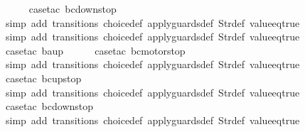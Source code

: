 \begin{isabellebody}
\ \ \ \ \isamarkupfalse%
\ {\isacharparenleft}case{\isacharunderscore}tac\ {\isachardoublequoteopen}bc{\isacharequal}down{}{}stop{\isachardoublequoteclose}{\isacharparenright}\isanewline
\ \ \ \ \ \isamarkupfalse%
\ {\isacharparenleft}simp\ add{\isacharcolon}\ transitions\ choice{\isacharunderscore}def\ apply{\isacharunderscore}guards{\isacharunderscore}def\ Str{\isacharunderscore}def\ value{\isacharunderscore}eq{\isacharunderscore}true{\isacharparenright}\isanewline
\ \ \ \ \isamarkupfalse%
\ {\isacharparenleft}simp\ add{\isacharcolon}\ transitions\ choice{\isacharunderscore}def\ apply{\isacharunderscore}guards{\isacharunderscore}def\ Str{\isacharunderscore}def\ value{\isacharunderscore}eq{\isacharunderscore}true{\isacharparenright}\isanewline
\ \ \ \isamarkupfalse%
\ {\isacharparenleft}case{\isacharunderscore}tac\ {\isachardoublequoteopen}ba{\isacharequal}up{}{}{\isachardoublequoteclose}{\isacharparenright}\isanewline
\ \ \ \ \isamarkupfalse%
\ {\isacharparenleft}case{\isacharunderscore}tac\ {\isachardoublequoteopen}bc{\isacharequal}motorstop{}{\isachardoublequoteclose}{\isacharparenright}\isanewline
\ \ \ \ \ \isamarkupfalse%
\ {\isacharparenleft}simp\ add{\isacharcolon}\ transitions\ choice{\isacharunderscore}def\ apply{\isacharunderscore}guards{\isacharunderscore}def\ Str{\isacharunderscore}def\ value{\isacharunderscore}eq{\isacharunderscore}true{\isacharparenright}\isanewline
\ \ \ \ \isamarkupfalse%
\ {\isacharparenleft}case{\isacharunderscore}tac\ {\isachardoublequoteopen}bc{\isacharequal}up{}{}stop{\isachardoublequoteclose}{\isacharparenright}\isanewline
\ \ \ \ \ \isamarkupfalse%
\ {\isacharparenleft}simp\ add{\isacharcolon}\ transitions\ choice{\isacharunderscore}def\ apply{\isacharunderscore}guards{\isacharunderscore}def\ Str{\isacharunderscore}def\ value{\isacharunderscore}eq{\isacharunderscore}true{\isacharparenright}\isanewline
\ \ \ \ \isamarkupfalse%
\ {\isacharparenleft}case{\isacharunderscore}tac\ {\isachardoublequoteopen}bc{\isacharequal}down{}{}stop{\isachardoublequoteclose}{\isacharparenright}\isanewline
\ \ \ \ \ \isamarkupfalse%
\ {\isacharparenleft}simp\ add{\isacharcolon}\ transitions\ choice{\isacharunderscore}def\ apply{\isacharunderscore}guards{\isacharunderscore}def\ Str{\isacharunderscore}def\ value{\isacharunderscore}eq{\isacharunderscore}true{\isacharparenright}\isanewline

\end{isabellebody}
